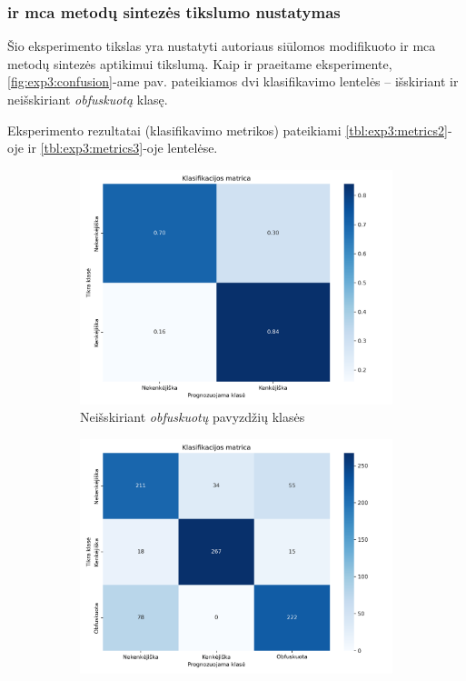 \subsubsection{\LIME ir \gls{mca} metodų sintezės tikslumo nustatymas}\label{sec:exp:3}

Šio eksperimento tikslas yra nustatyti autoriaus siūlomos modifikuoto \LIME ir \gls{mca} metodų sintezės  aptikimui tikslumą. Kaip ir praeitame eksperimente, \ref{fig:exp3:confusion}-ame pav. pateikiamos dvi klasifikavimo lentelės -- išskiriant ir neišskiriant \textit{obfuskuotą} klasę. 

Eksperimento rezultatai (klasifikavimo metrikos) pateikiami \ref{tbl:exp3:metrics2}-oje ir \ref{tbl:exp3:metrics3}-oje lentelėse.

\begin{figure}[h]
    \begin{subfigure}{0.5\textwidth}
        \centering
        \includegraphics[width=\textwidth]{images/synthesis_2x2.png}
        \caption{Neišskiriant \textit{obfuskuotų} pavyzdžių klasės}
    \end{subfigure}
    \begin{subfigure}{0.5\textwidth}
        \centering
        \includegraphics[width=\textwidth]{images/synthesis_3x3.png}

\end{subfigure}
\end{figure}

